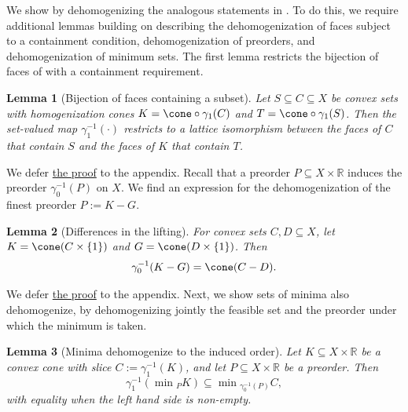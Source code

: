 \documentclass{article}
\theoremstyle{plain}
\newtheorem{lemma}[lemma]{Lemma}
\theoremstyle{definition}
\theoremstyle{remark}
\begin{document}
We show  by dehomogenizing the analogous statements in . To do this, we require additional lemmas building on  describing the dehomogenization of faces subject to a containment condition, dehomogenization of preorders, and dehomogenization of minimum sets.
The first lemma restricts the bijection of faces of  with a containment requirement.
\begin{lemma}[Bijection of faces containing a subset]
\label{loc:bijection_of_faces_containing_a_subset.statement}
Let $S \subseteq C \subseteq X$ be convex sets with homogenization cones $K = \cone \circ \gamma_1(C)$ and $T = \cone \circ \gamma_1(S)$. Then the set-valued map $\gamma_1^{-1}(\cdot)$ restricts to a lattice isomorphism between the faces of $C$ that contain $S$ and the faces of $K$ that contain $T$.
\end{lemma}
We defer \hyperlink{loc:bijection_of_faces_containing_a_subset.proof}{the proof} to the appendix.
Recall that a preorder $P \subseteq X  \times \mathbb{R}$ induces the preorder $\gamma_0^{-1}(P)$ on $X$. We find an expression for the dehomogenization of the finest preorder $P := K-G$.
\begin{lemma}[Differences in the lifting]
\label{loc:differences_in_the_lifting.statement}
For convex sets $C, D \subseteq X$, let $K = \cone(C \times \{1\})$ and
$G = \cone(D \times \{1\})$. Then
\begin{equation*}
\gamma_0^{-1}(K - G) = \cone(C-D).
\end{equation*}
\end{lemma}
We defer \hyperlink{loc:differences_in_the_lifting.proof}{the proof} to the appendix.
Next, we show sets of minima also dehomogenize, by dehomogenizing jointly the feasible set and the preorder under which the minimum is taken.
\begin{lemma}[Minima dehomogenize to the induced order]
\label{loc:minima_dehomogenize_to_the_induced_order.statement}
Let $K \subseteq X \times \mathbb{R}$ be a convex cone with slice $C := \gamma_1^{-1}(K)$, and let $P \subseteq X \times \mathbb{R}$ be a preorder. Then
\begin{equation*}
\gamma_1^{-1}(\min{}_P K) \subseteq \min{}_{\gamma_0^{-1}(P)}C,
\end{equation*}
with equality when the left hand side is non-empty.
\end{lemma}
\end{document}
